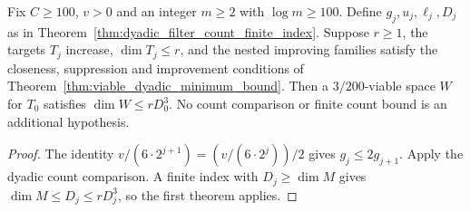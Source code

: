 \begin{theorem}
    \label{thm:viable_dyadic_filter_minimum_bound}
    \leanok
    Fix $C\ge100$, $v>0$ and an integer $m\ge2$ with $\log m\ge100$.
    Define $g_j,u_j,\ell_j,D_j$ as in
    Theorem~\ref{thm:dyadic_filter_count_finite_index}.
    Suppose $r\ge1$, the targets $T_j$ increase, $\dim T_j\le r$,
    and the nested improving families satisfy the closeness,
    suppression and improvement conditions of
    Theorem~\ref{thm:viable_dyadic_minimum_bound}.
    Then a $3/200$-viable space $W$ for $T_0$ satisfies
    $\dim W\le rD_0^3$. No count comparison or finite count bound
    is an additional hypothesis.
\end{theorem}
\begin{proof}
    \leanok
    The identity $v/(6\cdot2^{j+1})=(v/(6\cdot2^j))/2$ gives
    $g_j\le2g_{j+1}$. Apply the dyadic count comparison.
    A finite index with $D_j\ge\dim M$ gives
    $\dim M\le D_j\le rD_j^3$, so the first theorem applies.
\end{proof}
